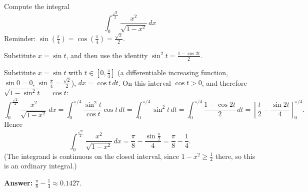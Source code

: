 
\begin{question}
Compute the integral
\[ \int_0^{\frac{\sqrt2}{2}} \frac{x^2}{\sqrt{1 - x^2}}\,dx \]
Reminder: $\sin(\frac\pi4) = \cos(\frac\pi4) = \frac{\sqrt2}{2}$.
\end{question}

\begin{hint}
Substitute $x = \sin t$, and then use the identity $\sin^2 t = \frac{1 - \cos 2t}{2}$.
\end{hint}

\begin{solution}
Substitute $x = \sin t$ with $t\in[0,\frac\pi4]$ (a differentiable increasing function, $\sin 0 = 0$, $\sin\frac\pi4 = \frac{\sqrt2}2$), $dx = \cos t\,dt$.
On this interval $\cos t > 0$, and therefore $\sqrt{1 - \sin^2 t} = \cos t$:
\[ \int_0^{\frac{\sqrt2}{2}}\frac{x^2}{\sqrt{1-x^2}}\,dx = \int_0^{\pi/4}\frac{\sin^2 t}{\cos t}\cos t\,dt = \int_0^{\pi/4}\sin^2 t\,dt
= \int_0^{\pi/4}\frac{1 - \cos 2t}{2}\,dt = \left[\frac t2 - \frac{\sin 2t}{4}\right]_0^{\pi/4}. \]
Hence
\[ \int_0^{\frac{\sqrt2}{2}}\frac{x^2}{\sqrt{1-x^2}}\,dx = \frac\pi8 - \frac{\sin\frac\pi2}{4} = \frac{\pi}{8} - \frac14. \]
(The integrand is continuous on the closed interval, since $1 - x^2 \ge \frac12$ there, so this is an ordinary integral.)

\textbf{Answer:} $\frac\pi8 - \frac14 \approx 0.1427$.
\end{solution}
